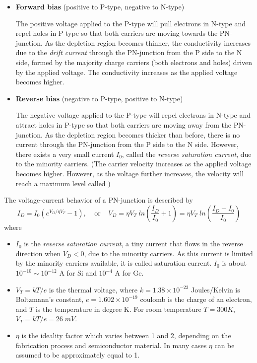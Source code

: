 \begin{itemize}
\item {\bf Forward bias} (positive to P-type, negative to N-type)

  The positive voltage applied to the P-type will pull electrons in N-type
  and repel holes in P-type so that both carriers are moving towards the 
  PN-junction. As the depletion region becomes thinner, the conductivity 
  increases due to the {\em drift current} through the PN-junction from 
  the P side to the N side, formed by the majority charge carriers (both 
  electrons and holes) driven by the applied voltage. The conductivity 
  increases as the applied voltage becomes higher. 

\item {\bf Reverse bias} (negative to P-type, positive to N-type)

  The negative voltage applied to the P-type will repel electrons in N-type
  and attract holes in P-type so that both carriers are moving away from 
  the PN-junction. As the depletion region becomes thicker than before, 
  there is no current through the PN-junction from the P side to the N side.
  However, there exists a very small current $I_0$, called the 
  {\em reverse saturation current}, due to the minority carriers.
  (The carrier velocity increases as the applied voltage becomes higher. 
  However, as the voltage further increases, the velocity will reach a 
  maximum level called
  )

  

\end{itemize}
The voltage-current behavior of a PN-junction is described by
\[
I_D=I_0 \left( e^{V_D/\eta V_T}-1 \right), \;\;\;\;\mbox{or}\;\;\;\;
V_D=\eta V_T\;ln \left(\frac{I_D}{I_0}+1\right)
=\eta V_T\;ln \left(\frac{I_D+I_0}{I_0}\right)	
\]
where 
\begin{itemize}
\item $I_0$ is the {\em reverse saturation current}, a tiny current that 
  flows in the reverse direction when $V_D < 0$, due to the minority 
  carriers. As this current is limited by the minority carriers available,
  it is called saturation current. $I_0$ is about $10^{-10} \sim 10^{-12}$ 
  A for Si and $10^{-4}$ A for Ge.
\item $ V_T=kT/e $ is the thermal voltage, where 
  $k=1.38\times 10^{-23}$ Joules/Kelvin is Boltzmann's constant, 
  $e=1.602\times 10^{-19}$ coulomb is the charge of an electron, and
  $T$ is the temperature in degree K. For room temperature $T=300K$, 
  $V_T=kT/e=26\; mV$.
\item $\eta$ is the ideality factor which varies between 1 and 2, depending
  on the fabrication process and semiconductor material. In many cases $\eta$
  can be assumed to be approximately equal to 1.
\end{itemize}
